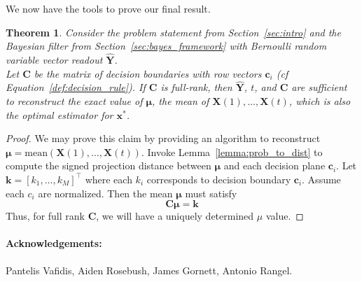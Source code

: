 \documentclass[12pt]{article}
\newtheorem{theorem}{Theorem}
\begin{document}
We now have the tools to prove our final result. 

\begin{theorem}
	\label{thm:main}
	Consider the problem statement from Section~\ref{sec:intro} and the Bayesian filter from Section~\ref{sec:bayes_framework} with Bernoulli random variable vector readout $\hat{\mathbf Y}$. \\
	
	Let $\mathbf C$ be the matrix of decision boundaries with row vectors $\mathbf c_i$ (cf Equation~\ref{def:decision_rule}). 
	If $\mathbf C$ is full-rank, then $\hat{\mathbf Y}$, $t$, and $\mathbf C$ are sufficient to reconstruct the exact value of $\mathbf \mu$, the mean of $\mathbf X(1), \dots, \mathbf X(t)$, which is also the optimal estimator for $\mathbf x^*$. 
\end{theorem}
\begin{proof}
	We may prove this claim by providing an algorithm to reconstruct $\mathbf \mu = \text{mean}(\mathbf X(1), \dots, \mathbf X(t))$.
	Invoke Lemma~\ref{lemma:prob_to_dist} to compute the signed projection distance between $\mathbf \mu$ and each decision plane $\mathbf c_i$.
	Let $\mathbf k = [k_1, \dots, k_M]^\top$ where each $k_i$ corresponds to decision boundary $\mathbf c_i$.
	Assume each $c_i$ are normalized. Then the mean $\mathbf \mu$ must satisfy 
	\begin{equation}
		\label{eqn:final_lin_sys}
		\mathbf {C \mu} = \mathbf k
	\end{equation}
	Thus, for full rank $\mathbf C$, we will have a uniquely determined $\mu$ value. 
\end{proof}




\paragraph{Acknowledgements: } Pantelis Vafidis, Aiden Rosebush, James Gornett, Antonio Rangel. 
\end{document}
